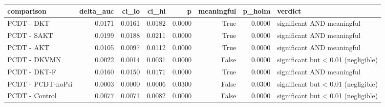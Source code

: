 \begin{tabular}{lrrrrrrl}
\toprule
comparison & delta\_auc & ci\_lo & ci\_hi & p & meaningful & p\_holm & verdict \\
\midrule
PCDT - DKT & 0.0171 & 0.0161 & 0.0182 & 0.0000 & True & 0.0000 & significant AND meaningful \\
PCDT - SAKT & 0.0199 & 0.0188 & 0.0211 & 0.0000 & True & 0.0000 & significant AND meaningful \\
PCDT - AKT & 0.0105 & 0.0097 & 0.0112 & 0.0000 & True & 0.0000 & significant AND meaningful \\
PCDT - DKVMN & 0.0022 & 0.0014 & 0.0031 & 0.0000 & False & 0.0000 & significant but < 0.01 (negligible) \\
PCDT - DKT-F & 0.0160 & 0.0150 & 0.0171 & 0.0000 & True & 0.0000 & significant AND meaningful \\
PCDT - PCDT-noPsi & 0.0003 & 0.0000 & 0.0006 & 0.0300 & False & 0.0300 & significant but < 0.01 (negligible) \\
PCDT - Control & 0.0077 & 0.0071 & 0.0082 & 0.0000 & False & 0.0000 & significant but < 0.01 (negligible) \\
\bottomrule
\end{tabular}
